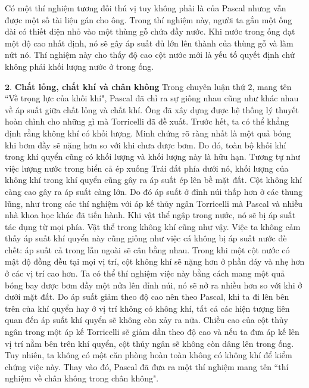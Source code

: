\begin{multicols}{2}
{\begin{figure}[H]
		\vspace*{-10pt}
\end{figure}
	Có một thí nghiệm tương đối thú vị tuy không phải là của Pascal nhưng vẫn được một số tài liệu gán cho ông. Trong thí nghiệm này, người ta gắn một ống dài có thiết diện nhỏ vào một thùng gỗ chứa đầy nước. Khi nước trong ống đạt một độ cao nhất định, nó sẽ gây áp suất đủ lớn lên thành của thùng gỗ và làm nứt nó. Thí nghiệm này cho thấy độ cao cột nước mới là yếu tố quyết định chứ không phải khối lượng nước ở trong ống.}
	\vskip 0.2cm
	$\pmb{2.}$ \textbf{\color{timhieukhoahoc}Chất lỏng, chất khí và chân không}
	\vskip 0.1cm
	Trong chuyên luận thứ $2$, mang tên ``Về trọng lực của khối khí", Pascal đã chỉ ra sự giống nhau cũng như khác nhau về áp suất giữa chất lỏng và chất khí. Ông đã xây dựng được hệ thống lý thuyết hoàn chình cho những gì mà Torricelli đã đề xuất. Trước hết, ta có thể khẳng định rằng không khí có khối lượng. Minh chứng rõ ràng nhất là một quả bóng khi bơm đầy sẽ nặng hơn so với khi chưa được bơm. Do đó, toàn bộ khối khí trong khí quyển cũng có khối lượng và khối lượng này là hữu hạn. Tương tự như việc lượng nước trong biển cả ép xuống Trái đất phía dưới nó, khối lượng của không khí trong khí quyển cũng gây ra áp suất ép lên bề mặt đất. Cột không khí càng cao gây ra áp suất càng lớn. Do đó áp suất ở đỉnh núi thấp hơn ở các thung lũng, như trong các thí nghiệm với áp kế thủy ngân Torricelli mà Pascal và nhiều nhà khoa học khác đã tiến hành.
	\vskip 0.1cm
	Khi vật thể ngập trong nước, nó sẽ bị áp suất tác dụng từ mọi phía. Vật thể trong không khí cũng như vậy. Việc ta không cảm thấy áp suất khí quyển này cũng giống như việc cá không bị áp suất nước đè chết: áp suất cả trong lẫn ngoài sẽ cân bằng nhau.
	\vskip 0.1cm
	Trong khi một cột nước có mật độ đồng đều tại mọi vị trí, cột không khí sẽ nặng hơn ở phần đáy và nhẹ hơn ở các vị trí cao hơn. Ta có thể thí nghiệm việc này bằng cách mang một quả bóng bay được bơm đầy một nửa lên đỉnh núi, nó sẽ nở ra nhiều hơn so với khi ở dưới mặt đất. Do áp suất giảm theo độ cao nên theo Pascal, khi ta đi lên bên trên của khí quyển hay ở vị trí không có không khí, tất cả các hiện tượng liên quan đến áp suất khí quyển sẽ không còn xảy ra nữa. Chiều cao của cột thủy ngân trong một áp kế Torricelli sẽ giảm dần theo độ cao và nếu ta đưa áp kế lên vị trí nằm bên trên khí quyển, cột thủy ngân sẽ không còn dâng lên trong ống. Tuy nhiên, ta không có một căn phòng hoàn toàn không có không khí để kiểm chứng việc này. Thay vào đó, Pascal đã đưa ra một thí nghiệm mang tên ``thí nghiệm về chân không trong chân không".

\end{multicols}
